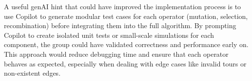 \documentclass[a4paper,10pt]{article}
\begin{document}
A useful genAI hint that could have improved the implementation process is to use Copilot to generate modular test cases for each operator (mutation, selection, recombination) before integrating them into the full algorithm. By prompting Copilot to create isolated unit tests or small-scale simulations for each component, the group could have validated correctness and performance early on. This approach would reduce debugging time and ensure that each operator behaves as expected, especially when dealing with edge cases like invalid tours or non-existent edges.
\end{document}
